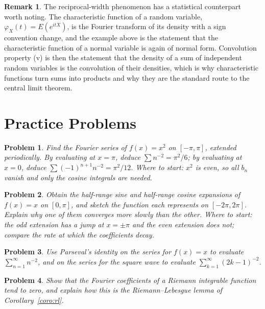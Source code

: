 \documentclass[12pt,a4paper]{report}
\theoremstyle{definition}
\newtheorem{remark}[thm]{Remark}
\theoremstyle{plain}
\newtheorem{problemx}{Problem}[section]
\newenvironment{problem}{\begin{problemx}}{\end{problemx}}
\begin{document}
\begin{remark}
The reciprocal-width phenomenon has a statistical counterpart worth noting. The
characteristic function of a random variable, $\varphi_X(t)=E\left(e^{itX}\right)$,
is the Fourier transform of its density with a sign convention change, and the
example above is the statement that the characteristic function of a normal
variable is again of normal form. Convolution property (v) is then the statement
that the density of a sum of independent random variables is the convolution of
their densities, which is why characteristic functions turn sums into products
and why they are the standard route to the central limit theorem.
\end{remark}

\section{Practice Problems}

\begin{problem}
Find the Fourier series of $f(x)=x^{2}$ on $[-\pi,\pi]$, extended periodically.
By evaluating at $x=\pi$, deduce $\sum n^{-2}=\pi^{2}/6$; by evaluating at
$x=0$, deduce $\sum(-1)^{n+1}n^{-2}=\pi^{2}/12$.
\emph{Where to start: $x^{2}$ is even, so all $b_n$ vanish and only the cosine
integrals are needed.}
\end{problem}

\begin{problem}
Obtain the half-range sine and half-range cosine expansions of $f(x)=x$ on
$[0,\pi]$, and sketch the function each represents on $[-2\pi,2\pi]$. Explain
why one of them converges more slowly than the other.
\emph{Where to start: the odd extension has a jump at $x=\pm\pi$ and the even
extension does not; compare the rate at which the coefficients decay.}
\end{problem}

\begin{problem}
Use Parseval's identity on the series for $f(x)=x$ to evaluate
$\sum^{\infty}_{n=1}n^{-2}$, and on the series for the square wave to evaluate
$\sum^{\infty}_{k=1}(2k-1)^{-2}$.
\end{problem}

\begin{problem}
Show that the Fourier coefficients of a Riemann integrable function tend to
zero, and explain how this is the Riemann--Lebesgue lemma of
Corollary~\ref{coro:rl}.
\end{problem}
\end{document}
